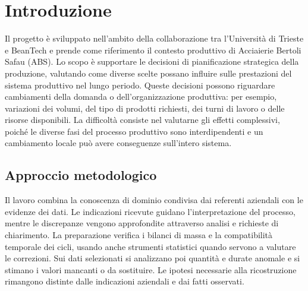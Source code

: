 \chapter{Introduzione}
\label{sec:introduction}

Il progetto è sviluppato nell'ambito della collaborazione tra l'Università di Trieste e BeanTech e prende come riferimento il contesto produttivo di Acciaierie Bertoli Safau (ABS). Lo scopo è supportare le decisioni di pianificazione strategica della produzione, valutando come diverse scelte possano influire sulle prestazioni del sistema produttivo nel lungo periodo. Queste decisioni possono riguardare cambiamenti della domanda o dell'organizzazione produttiva: per esempio, variazioni dei volumi, del tipo di prodotti richiesti, dei turni di lavoro o delle risorse disponibili. La difficoltà consiste nel valutarne gli effetti complessivi, poiché le diverse fasi del processo produttivo sono interdipendenti e un cambiamento locale può avere conseguenze sull'intero sistema.


\section{Approccio metodologico}
\label{sec:modus-operandi}

Il lavoro combina la conoscenza di dominio condivisa dai referenti aziendali con le evidenze dei dati. Le indicazioni ricevute guidano l'interpretazione del processo, mentre le discrepanze vengono approfondite attraverso analisi e richieste di chiarimento. La preparazione verifica i bilanci di massa e la compatibilità temporale dei cicli, usando anche strumenti statistici quando servono a valutare le correzioni. Sui dati selezionati si analizzano poi quantità e durate anomale e si stimano i valori mancanti o da sostituire. Le ipotesi necessarie alla ricostruzione rimangono distinte dalle indicazioni aziendali e dai fatti osservati.
